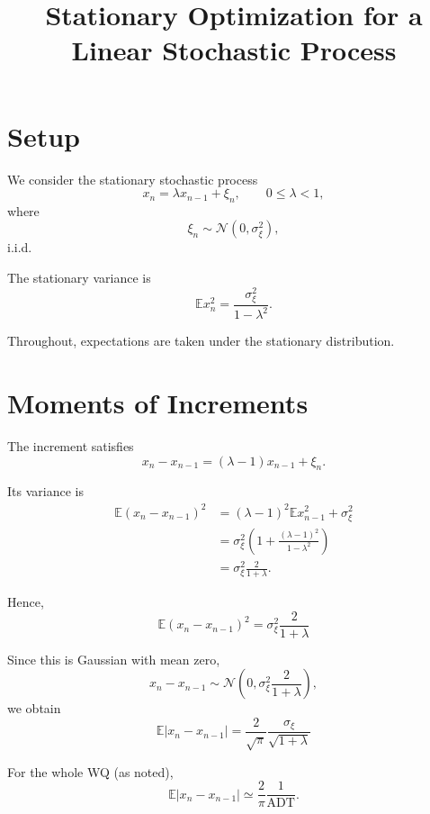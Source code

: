 \documentclass[11pt]{article}
\title{Stationary Optimization for a Linear Stochastic Process}
\author{}
\date{}
\begin{document}
\maketitle

\section{Setup}

We consider the stationary stochastic process
\begin{equation}
x_n = \lambda x_{n-1} + \xi_n,
\qquad 0 \le \lambda < 1,
\end{equation}
where
\[
\xi_n \sim \mathcal N(0,\sigma_\xi^2),
\]
i.i.d.

The stationary variance is
\begin{equation}
\mathbb E x_n^2
= \frac{\sigma_\xi^2}{1-\lambda^2}.
\end{equation}

Throughout, expectations are taken under the stationary distribution.

\section{Moments of Increments}

The increment satisfies
\[
x_n - x_{n-1} = (\lambda - 1)x_{n-1} + \xi_n.
\]

Its variance is
\begin{align}
\mathbb E (x_n - x_{n-1})^2
&= (\lambda-1)^2 \mathbb E x_{n-1}^2 + \sigma_\xi^2 \\
&= \sigma_\xi^2 \left(
1 + \frac{(\lambda-1)^2}{1-\lambda^2}
\right) \\
&= \sigma_\xi^2 \frac{2}{1+\lambda}.
\end{align}

Hence,
\begin{equation}
\boxed{
\mathbb E (x_n - x_{n-1})^2
= \sigma_\xi^2 \frac{2}{1+\lambda}
}
\end{equation}

Since this is Gaussian with mean zero,
\[
x_n - x_{n-1} \sim \mathcal N
\left(0,\sigma_\xi^2 \frac{2}{1+\lambda}\right),
\]
we obtain
\begin{equation}
\boxed{
\mathbb E |x_n - x_{n-1}|
= \frac{2}{\sqrt{\pi}}
\frac{\sigma_\xi}{\sqrt{1+\lambda}}
}
\end{equation}

For the whole WQ (as noted),
\begin{equation}
\mathbb E |x_n - x_{n-1}|
\simeq \frac{2}{\pi} \frac{1}{\text{ADT}}.
\end{equation}
\end{document}
